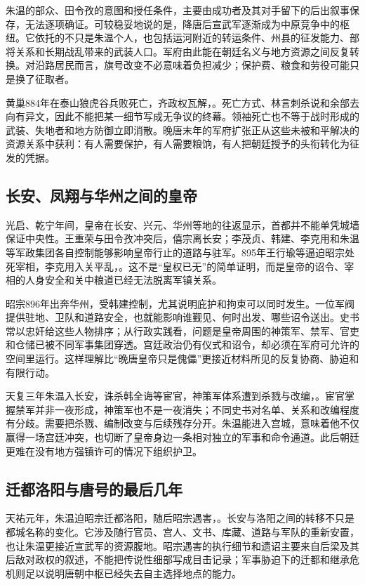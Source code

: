朱温的部众、田令孜的意图和授任条件，主要由成功者及其对手留下的后出叙事保存，无法逐项确证。可较稳妥地说的是，降唐后宣武军逐渐成为中原竞争中的枢纽。它依托的不只是朱温个人，也包括运河附近的转运条件、州县的征发能力、部将关系和长期战乱带来的武装人口。军府由此能在朝廷名义与地方资源之间反复转换。对沿路居民而言，旗号改变不必意味着负担减少；保护费、粮食和劳役可能只是换了征取者。

黄巢884年在泰山狼虎谷兵败死亡，齐政权瓦解，。死亡方式、林言刺杀说和余部去向有异文，因此不能把某一细节写成无争议的终幕。领袖死亡也不等于战时形成的武装、失地者和地方防御立即消散。晚唐末年的军府扩张正从这些未被和平解决的资源关系中获利：有人需要保护，有人需要粮饷，有人把朝廷授予的头衔转化为征发的凭据。

\subsection{长安、凤翔与华州之间的皇帝}
光启、乾宁年间，皇帝在长安、兴元、华州等地的往返显示，首都并不能单凭城墙保证中央性。王重荣与田令孜冲突后，僖宗离长安；李茂贞、韩建、李克用和朱温等军政集团各自控制能够影响皇帝行止的道路与驻军。895年王行瑜等逼迫昭宗处死宰相，李克用入关平乱，。这不是“皇权已无”的简单证明，而是皇帝的诏令、宰相的人身安全和关中粮道已经无法脱离军镇关系。

昭宗896年出奔华州，受韩建控制，尤其说明庇护和拘束可以同时发生。一位军阀提供驻地、卫队和道路安全，也就能影响谁觐见、何时出发、哪些诏令送出。史书常以忠奸给这些人物排序；从行政实践看，问题是皇帝周围的神策军、禁军、官吏和仓储已被不同军事集团穿透。宫廷政治仍有仪式和诏令，却必须在军府可允许的空间里运行。这样理解比“晚唐皇帝只是傀儡”更接近材料所见的反复协商、胁迫和有限行动。

天复三年朱温入长安，诛杀韩全诲等宦官，神策军体系遭到杀戮与改编，。宦官掌握禁军并非一夜形成，神策军也不是一夜消失；不同史书对名单、关系和改编程度有分歧。需要把杀戮、编制改变与后续残存分开。朱温能进入宫城，意味着他不仅赢得一场宫廷冲突，也切断了皇帝身边一条相对独立的军事和命令通道。此后朝廷更难在没有地方强镇许可的情况下组织护卫。

\subsection{迁都洛阳与唐号的最后几年}
天祐元年，朱温迫昭宗迁都洛阳，随后昭宗遇害，。长安与洛阳之间的转移不只是都城名称的变化。它涉及随行官员、宫人、文书、库藏、道路与军队的重新安置，也让朱温更接近宣武军的资源腹地。昭宗遇害的执行细节和遗诏主要来自后梁及其后敌对政权的叙述，不能把传说性细部写成目击记录；军事胁迫下的迁都和继承危机则足以说明唐朝中枢已经失去自主选择地点的能力。

